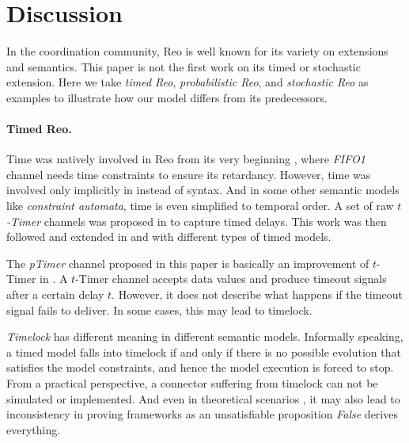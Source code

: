 \section{Discussion}
\label{sec:discussion}

In the coordination community, Reo is well known for its variety on extensions and semantics\cite{Jongmans2012}. This paper is not the first work on its timed or stochastic 
extension. Here we take \emph{timed Reo}, \emph{probabilistic Reo}, and \emph{stochastic Reo} 
as examples to illustrate how our model differs from its predecessors.

\paragraph{Timed Reo.}
Time was natively involved in Reo from its very beginning \cite{ARBAB2004}, where \emph{FIFO1} channel needs time constraints to ensure its retardancy. However, time was involved only implicitly in  \cite{ARBAB2004} instead of syntax. And in some other semantic models like \emph{constraint automata}, time is even simplified to temporal order. A set of raw \emph{$t$-Timer} channels was proposed in \cite{Arbab2006} to capture timed delays. This work was then followed and extended in \cite{Meng2007} and \cite{Meng2012} with different types of timed models.

The \emph{pTimer} channel proposed in this paper is basically an improvement of {$t$-Timer} in \cite{Meng2012}. A {$t$-Timer} channel accepts data values and produce timeout signals after a certain delay $t$. However, it does not describe what happens if the timeout signal fails to deliver. In some cases, this may lead to timelock.

\emph{Timelock} has different meaning in different semantic models. Informally speaking, a timed model falls into timelock if and only if there is no possible evolution that satisfies the model constraints, and hence the model execution is forced to stop. From a practical perspective, a connector suffering from timelock can not be simulated or implemented. And even in theoretical scenarios \cite{Li2015}, it may also lead to inconsistency in proving frameworks as an unsatisfiable proposition \emph{False} derives everything.

